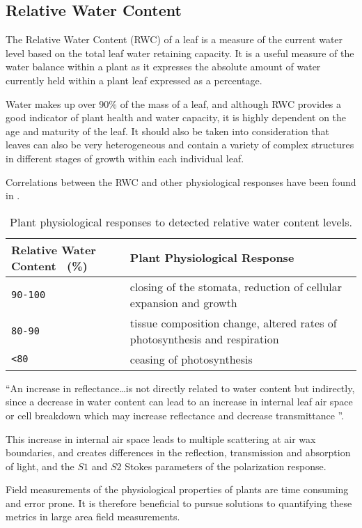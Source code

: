 \subsection{Relative Water Content}
The Relative Water Content (RWC) of a leaf is a measure of the current water level based on the total leaf water retaining capacity.  It is a useful measure of the water balance within a plant as it expresses the absolute amount of water currently held within a plant leaf expressed as a percentage.

Water makes up over 90\% of the mass of a leaf, and although RWC provides a good indicator of plant health and water capacity, it is highly dependent on the age and maturity of the leaf.  It should also be taken into consideration that leaves can also be very heterogeneous and contain a variety of complex structures in different stages of growth within each individual leaf.

Correlations between the RWC and other physiological responses have been found in \cite{ecophysiology}.

\begin{table}[h]
  \centering
  \begin{tabular}{ll}
    \toprule
    \textbf{Relative Water Content ~(\%)}      & \textbf{Plant Physiological Response}\\
    \midrule
      \texttt{90-100}          & closing of the stomata, reduction of cellular expansion and growth\\
      \texttt{80-90}           & tissue composition change, altered rates of photosynthesis and respiration\\
      \texttt{<80}         & ceasing of photosynthesis\\
    \bottomrule
  \end{tabular}
  \caption{%
    Plant physiological responses to detected relative water content levels.
  }
  \label{tab:Packages}
\end{table}

“An increase in reflectance…is not directly related to water content but indirectly, since a decrease in water content can lead to an increase in internal leaf air space or cell breakdown which may increase reflectance and decrease transmittance \cite{photonvegetation}”.

This increase in internal air space leads to multiple scattering at air wax boundaries, and creates differences in the reflection, transmission and absorption of light, and the $S1$ and $S2$ Stokes parameters of the polarization response.

Field measurements of the physiological properties of plants are time consuming and error prone.  It is therefore beneficial to pursue solutions to quantifying these metrics in large area field measurements.
